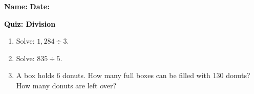 \documentclass[12pt, letterpaper, fleqn]{article}
\begin{document}
\textbf{Name:} \underline{\hspace{5cm}}
\hfill
\textbf{Date:} \underline{\hspace{3cm}}\\

\begin{tcolorbox}[colback=customteal!20]
    \large\textcolor{black}{\textbf{Quiz: Division}}
\end{tcolorbox}
\begin{enumerate}[itemsep=3.5cm, leftmargin=0.6cm]
\item Solve: $1,284 \div 3$.
\vspace{3.5cm}
\item Solve: $835 \div 5$.
\vspace{3.5cm}
\item A box holds 6 donuts. How many full boxes can be filled with 130 donuts? How many donuts are left over?
\end{enumerate}
\end{document}
